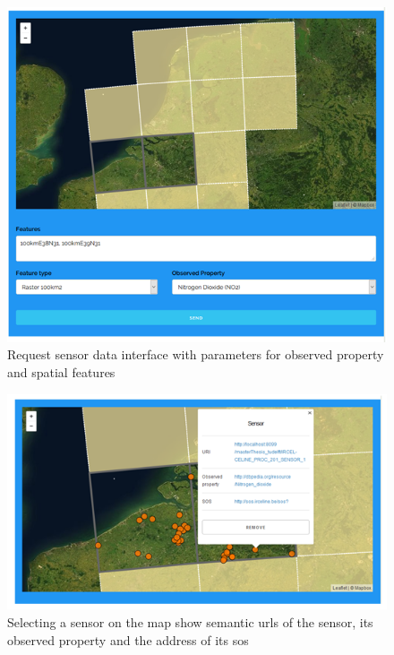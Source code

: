 \begin{figure}
	\centering
	\includegraphics[width=\linewidth]{figs/interface1.PNG}
	\caption{Request sensor data interface with parameters for observed property and spatial features}
	\label{fig:interface1}
\end{figure}

\begin{figure}
	\centering
	\includegraphics[width=\linewidth]{figs/interface3.PNG}
	\caption{Selecting a sensor on the map show semantic \acp{url} of the sensor, its observed property and the address of its \ac{sos}}
	\label{fig:interface2}
\end{figure}

